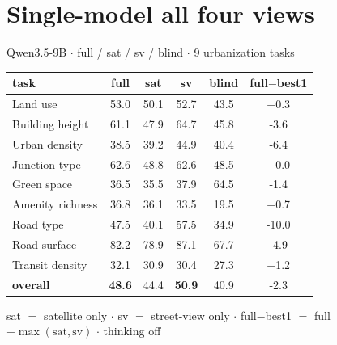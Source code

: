 \documentclass[aspectratio=169]{beamer}
\begin{document}
\section{Single-model \textemdash{} all four views}
\begin{frame}{Qwen3.5-9B \textbf{$\cdot$} full / sat / sv / blind \textbf{$\cdot$} 9 urbanization tasks}
\centering\scriptsize
\begin{tabular}{lccccc}
\toprule
task & full & sat & sv & blind & full$-$best1 \\
\midrule
Land use & 53.0 & 50.1 & 52.7 & 43.5 & +0.3 \\
Building height & 61.1 & 47.9 & 64.7 & 45.8 & \textcolor{bad}{-3.6} \\
Urban density & 38.5 & 39.2 & 44.9 & 40.4 & \textcolor{bad}{-6.4} \\
Junction type & 62.6 & 48.8 & 62.6 & 48.5 & +0.0 \\
Green space & 36.5 & 35.5 & 37.9 & 64.5 & \textcolor{bad}{-1.4} \\
Amenity richness & 36.8 & 36.1 & 33.5 & 19.5 & +0.7 \\
Road type & 47.5 & 40.1 & 57.5 & 34.9 & \textcolor{bad}{-10.0} \\
Road surface & 82.2 & 78.9 & 87.1 & 67.7 & \textcolor{bad}{-4.9} \\
Transit density & 32.1 & 30.9 & 30.4 & 27.3 & +1.2 \\
\midrule
\textbf{overall} & \textbf{48.6} & 44.4 & \textbf{50.9} & 40.9 & \textcolor{bad}{-2.3} \\
\bottomrule
\end{tabular}
\vspace{2pt}\par\tiny sat $=$ satellite only \textbf{$\cdot$} sv $=$ street-view only \textbf{$\cdot$} full$-$best1 $=$ full $-\max(\text{sat},\text{sv})$ \textbf{$\cdot$} thinking off
\end{frame}
\end{document}
